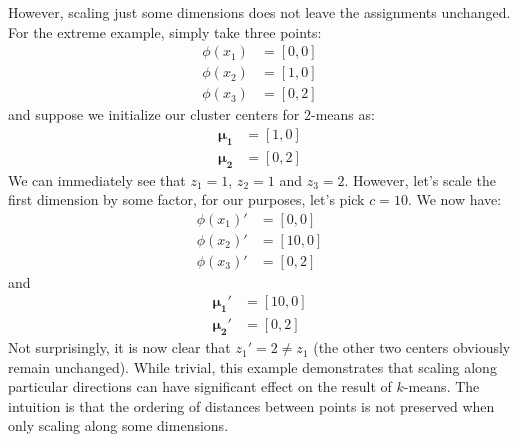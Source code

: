 \documentclass[12pt]{article}
\begin{document}
\begin{enumerate}[label=(\alph*)]
    However, scaling just some dimensions does not leave the assignments unchanged. For the extreme example, simply take three points:
    \begin{align*}
      \phi(x_1) &= [0,0] \\
      \phi(x_2) &= [1,0] \\
      \phi(x_3) &= [0,2]
    \end{align*}
    and suppose we initialize our cluster centers for $2$-means as:
    \begin{align*}
      \bm{\mu_1} &= [1,0] \\
      \bm{\mu_2} &= [0,2]
    \end{align*}
    We can immediately see that $z_1 = 1$, $z_2 = 1$ and $z_3 = 2$. However, let's scale the first dimension by some factor, for our purposes, let's pick $c = 10$. We now have:
    \begin{align*}
      \phi(x_1)' &= [0,0] \\
      \phi(x_2)' &= [10,0] \\
      \phi(x_3)' &= [0,2]
    \end{align*}
    and 
     \begin{align*}
      \bm{\mu_1}' &= [10,0] \\
      \bm{\mu_2}' &= [0,2]
    \end{align*}
    Not surprisingly, it is now clear that $z_1' = 2 \neq z_1$ (the other two centers obviously remain unchanged). While trivial, this example demonstrates that scaling along particular directions can have significant effect on the result of $k$-means. The intuition is that the ordering of distances between points is not preserved when only scaling along some dimensions.
  \end{enumerate}
\end{document}
